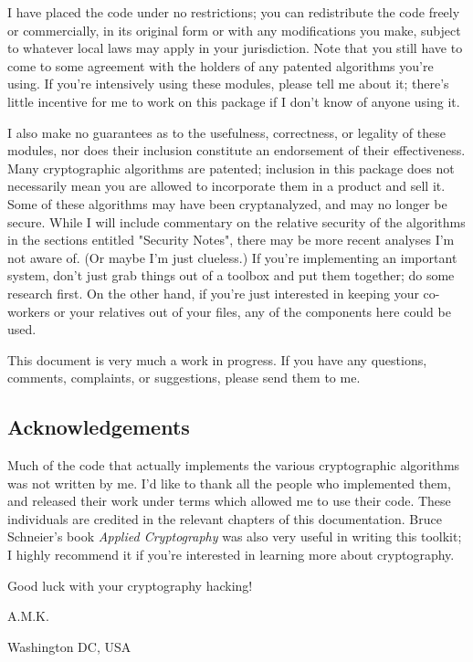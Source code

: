 \documentclass{howto}
\begin{document}
I have placed the code under no restrictions; you can redistribute the
code freely or commercially, in its original form or with any
modifications you make, subject to whatever local laws may apply in your
jurisdiction.  Note that you still have to come to some agreement with
the holders of any patented algorithms you're using.  If you're
intensively using these modules, please tell me about it; there's little
incentive for me to work on this package if I don't know of anyone using
it.

I also make no guarantees as to the usefulness, correctness, or legality
of these modules, nor does their inclusion constitute an endorsement of
their effectiveness.  Many cryptographic algorithms are patented;
inclusion in this package does not necessarily mean you are allowed to
incorporate them in a product and sell it.  Some of these algorithms may
have been cryptanalyzed, and may no longer be secure.  While I will
include commentary on the relative security of the algorithms in the
sections entitled "Security Notes", there may be more recent analyses
I'm not aware of.  (Or maybe I'm just clueless.)  If you're implementing
an important system, don't just grab things out of a toolbox and put
them together; do some research first.  On the other hand, if you're
just interested in keeping your co-workers or your relatives out of your
files, any of the components here could be used.

This document is very much a work in progress.  If you have any
questions, comments, complaints, or suggestions, please send them to me.

\subsection{Acknowledgements}
Much of the code that actually implements the various cryptographic
algorithms was not written by me.  I'd like to thank all the people who
implemented them, and released their work under terms which allowed me
to use their code.  These individuals are credited in the relevant
chapters of this documentation.  Bruce Schneier's book \emph{Applied
Cryptography} was also very useful in writing this toolkit; I highly
recommend it if you're interested in learning more about cryptography.

Good luck with your cryptography hacking!

A.M.K.


Washington DC, USA
\end{document}
